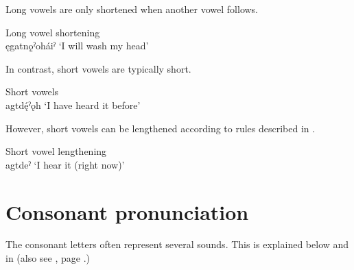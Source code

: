 Long vowels are only shortened when another vowel follows.

\ea\label{shortening.long.vowels} Long vowel shortening\\
ęgatnǫ̱ˀoháiˀ ‘I will wash my head’
\z


In contrast, short vowels are typically short.

\ea\label{short.vowels} Short vowels\\
agtdę́ˀǫh ‘I have heard it before’
\z 


However, short vowels can be lengthened according to rules described in .

\ea\label{lengthening.short.vowels} Short vowel lengthening\\
agtdeˀ ‘I hear it (right now)’
\z 
 

\section{Consonant pronunciation}
The consonant letters often represent several sounds. This is explained below and in  (also see , page \pageref{figtab:1:consspell}.)

